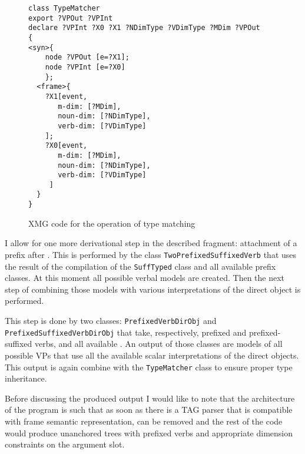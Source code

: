 \begin{figure}
\begin{lstlisting}[style=xmg]
class TypeMatcher
export ?VPOut ?VPInt
declare ?VPInt ?X0 ?X1 ?NDimType ?VDimType ?MDim ?VPOut
{
<syn>{
    node ?VPOut [e=?X1];
    node ?VPInt [e=?X0]
    };
  <frame>{
    ?X1[event,
       m-dim: [?MDim],
       noun-dim: [?NDimType],
       verb-dim: [?VDimType]
    ];
    ?X0[event,
       m-dim: [?MDim],
       noun-dim: [?NDimType],
       verb-dim: [?VDimType]
     ]
  }
}
\end{lstlisting}
\caption{XMG code for the operation of type matching \label{xmg:typemather}}
\end{figure}

I allow for one more derivational step in the described fragment: attachment of a prefix after . This is performed by the class \texttt{TwoPrefixedSuffixedVerb} that uses the result of the compilation of the \texttt{SuffTyped} class and all available prefix classes. At this moment all possible verbal models are created. Then the next step of combining those models with various interpretations of the direct object is performed.

This step is done by two classes: \texttt{PrefixedVerbDirObj} and \texttt{PrefixedSuffixedVerbDirObj} that take, respectively, prefixed and prefixed-suffixed verbs, and all available . An output of those classes are models of all possible VPs that use all the available scalar interpretations of the direct objects. This output is again combine with the \texttt{TypeMatcher} class to ensure proper type inheritance.

Before discussing the produced output I would like to note that the architecture of the program is such that as soon as there is a TAG parser that is compatible with frame semantic representation,  can be removed and the rest of the code would produce unanchored trees with prefixed verbs and appropriate dimension constraints on the argument slot.

